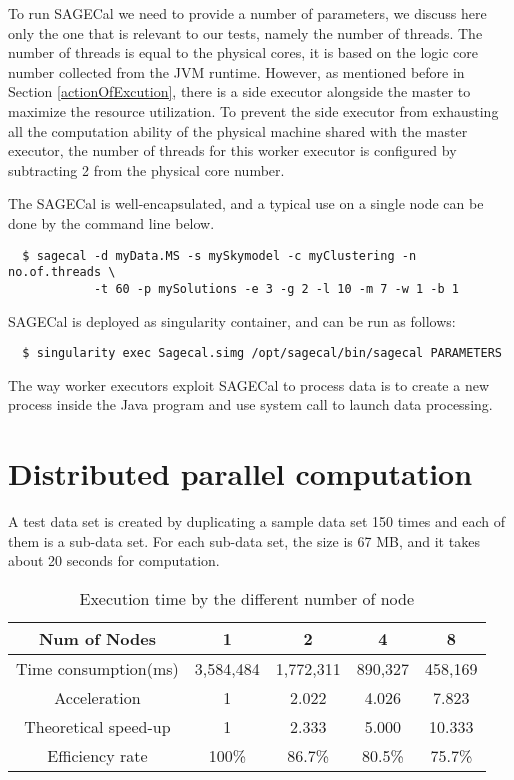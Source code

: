 To run SAGECal we need to provide a number of parameters, we discuss here only the one that is relevant to our tests, namely the number of threads.
The number of threads is equal to the physical cores, it is based on the logic core number collected from the JVM runtime.  
However, as mentioned before in Section \ref{actionOfExcution}, there is a side executor alongside the master to maximize the resource utilization.
To prevent the side executor from exhausting all the computation ability of the physical machine shared with the master executor, the number of threads for this worker executor is configured by subtracting 2 from the physical core number.

The SAGECal is well-encapsulated, and a typical use on a single node can be done by the command line below.

\begin{verbatim}
  $ sagecal -d myData.MS -s mySkymodel -c myClustering -n no.of.threads \
            -t 60 -p mySolutions -e 3 -g 2 -l 10 -m 7 -w 1 -b 1
\end{verbatim}
SAGECal is deployed as singularity container, and can be run as follows:
\begin{verbatim}
  $ singularity exec Sagecal.simg /opt/sagecal/bin/sagecal PARAMETERS
\end{verbatim}

The way worker executors exploit SAGECal to process data is to create a new process inside the Java program and use system call to launch data processing.


\section{Distributed parallel computation}
A test data set is created by duplicating a sample data set 150 times and each of them is a sub-data set. 
For each sub-data set, the size is 67 MB, and it takes about 20 seconds for computation.


\begin{table}[]
    \centering
    \begin{tabular}{ccccc}
    \hline
    Num of Nodes      & 1         & 2         & 4       & 8       \\ \hline
    Time consumption(ms)  & 3,584,484 & 1,772,311 & 890,327 & 458,169 \\
    Acceleration      & 1         & 2.022     & 4.026   & 7.823   \\
    Theoretical speed-up & 1         & 2.333     & 5.000   & 10.333  \\
    Efficiency rate   & 100\%     & 86.7\%    & 80.5\%  & 75.7\% 
    \end{tabular}
    \caption{Execution time by the different number of node}
    \label{tab:acc}
\end{table}

